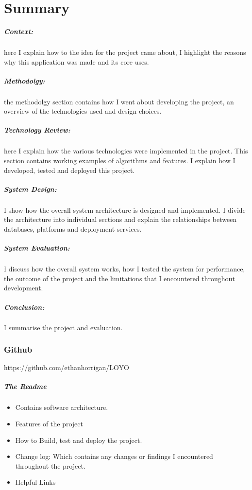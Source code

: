 \chapter{Summary}
\paragraph{Context:} here I explain how to the idea for the project came about, I highlight the reasons why this application was made and its core uses.
\paragraph{Methodolgy:} the methodolgy section contains how I went about developing the project, an overview of the technologies used and design choices.
\paragraph{Technology Review:} here I explain how the various technologies were implemented in the project. This section contains working examples of algorithms and features. I explain how I developed, tested and deployed this project.
\paragraph{System Design:} I show how the overall system architecture is designed and implemented. I divide the architecture into individual sections and explain the relationships between databases, platforms and deployment services.
\paragraph{System Evaluation:} I discuss how the overall system works, how I tested the system for performance, the outcome of the project and the limitations that I encountered throughout development.
\paragraph{Conclusion:} I summarise the project and evaluation.

\newpage
\subsection{Github}
https://github.com/ethanhorrigan/LOYO
\paragraph{The Readme}
\begin{itemize}
	\item Contains software architecture.


	\item Features of the project


	\item How to Build, test and deploy the project.


	\item Change log: Which contains any changes or findings I encountered throughout the project.


	\item Helpful Links
\end{itemize}
